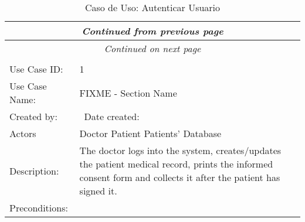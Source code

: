 \newpage
\begin{longtable}{| p{3.5cm} | p{9cm} |}
\endfirsthead
\multicolumn{2}{c}{\textit{Continued from previous page}}\\[12pt]
\hline
\endhead
\hline
\multicolumn{2}{c}{\textit{Continued on next page}} \\
\endfoot
\hline
\caption{Caso de Uso: Autenticar Usuario}\label{fig:1}\\
\endlastfoot


\hline
Use Case ID: & 1\\
\hline
Use Case Name: & FIXME - Section Name\\
\hline
Created by:&\hspace{2cm}\vrule\ Date created:\hspace{2cm}\vrule\\
\hline
Actors &
Doctor\newline
Patient\newline
Patients' Database\\
\hline
Description: &
The doctor logs into the system, creates/updates the patient medical record, prints the informed consent form and collects it after the patient has signed it.\\
\hline
Preconditions: &\mbox{}\par\vspace{-\baselineskip}

\end{longtable}
